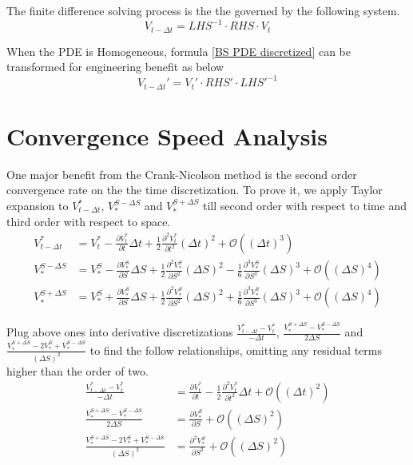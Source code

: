 \documentclass{article}
\begin{document}
The finite difference solving process is the the governed by the following system.
\begin{equation}
    V_{t - \Delta t} = {LHS}^{-1} \cdot RHS \cdot V_{t} \label{BS PDE discretized}
\end{equation}

When the PDE is Homogeneous, formula \ref{BS PDE discretized} can be transformed for engineering benefit as below
\begin{equation}
    V_{t - \Delta t}' = V_{t}' \cdot RHS' \cdot {LHS'}^{-1}
\end{equation}


\section{Convergence Speed Analysis}

One major benefit from the Crank-Nicolson method is the second order convergence rate on the the time discretization. To prove it, we apply Taylor expansion to $ V_{t - \Delta t}^{*} $, $ V_{*}^{S - \Delta S} $ and $ V_{*}^{S + \Delta S} $ till second order with respect to time and third order with respect to space.
\begin{align}
    V_{t - \Delta t}^{*} &= V_{t}^{*} - \frac{\partial V_{t}^{*}}{\partial t} \Delta t + \frac{1}{2} \frac{\partial^2 V_{t}^{*}}{\partial t^2} (\Delta t)^2 + \mathcal{O}\left(\left(\Delta t\right)^3\right) \\
    V_{*}^{S - \Delta S} &= V_{*}^{S} - \frac{\partial V_{*}^{S}}{\partial S} \Delta S + \frac{1}{2} \frac{\partial^2 V_{*}^{S}}{\partial S^2} (\Delta S)^2 - \frac{1}{6} \frac{\partial^3 V_{*}^{S}}{\partial S^3} (\Delta S)^3 + \mathcal{O}\left(\left(\Delta S\right)^4\right) \\
    V_{*}^{S + \Delta S} &= V_{*}^{S} + \frac{\partial V_{*}^{S}}{\partial S} \Delta S + \frac{1}{2} \frac{\partial^2 V_{*}^{S}}{\partial S^2} (\Delta S)^2 + \frac{1}{6} \frac{\partial^3 V_{*}^{S}}{\partial S^3} (\Delta S)^3 + \mathcal{O}\left(\left(\Delta S\right)^4\right)
\end{align}

Plug above ones into derivative discretizations $ \frac{V_{t - \Delta t}^{*} - V_{t}^{*}}{-\Delta t} $,  $ \frac{V_{*}^{S + \Delta S} - V_{*}^{S - \Delta S}}{2 \Delta S} $ and $ \frac{V_{*}^{S + \Delta S} - 2 V_{*}^{S} + V_{*}^{S - \Delta S}}{(\Delta S)^2} $ to find the follow relationships, omitting any residual terms higher than the order of two.
\begin{align}
    \frac{V_{t - \Delta t}^{*} - V_{t}^{*}}{-\Delta t} &= \frac{\partial V_{t}^{*}}{\partial t} - \frac{1}{2} \frac{\partial^2 V_{t}^{*}}{\partial t^2} \Delta t + \mathcal{O}\left(\left(\Delta t\right)^2\right) \\
    \frac{V_{*}^{S + \Delta S} - V_{*}^{S - \Delta S}}{2 \Delta S} &= \frac{\partial V_{*}^{S}}{\partial S} + \mathcal{O}\left(\left(\Delta S\right)^2\right) \\
    \frac{V_{*}^{S + \Delta S} - 2 V_{*}^{S} + V_{*}^{S - \Delta S}}{(\Delta S)^2} &= \frac{\partial^2 V_{*}^{S}}{\partial S^2} + \mathcal{O}\left(\left(\Delta S\right)^2\right)
\end{align}
\end{document}
